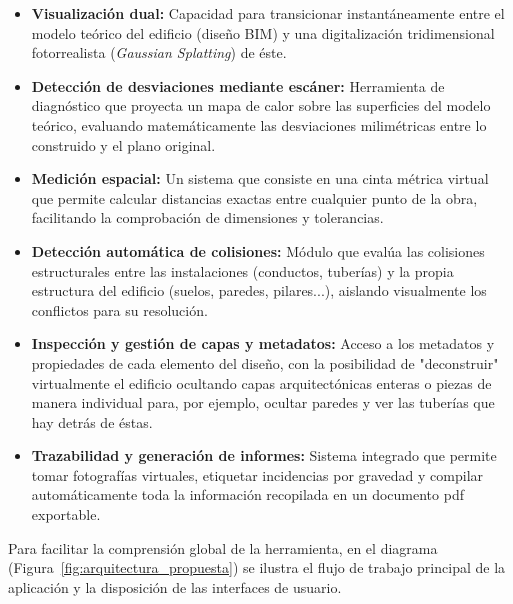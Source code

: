 \begin{itemize}
    \item \textbf{Visualización dual:} Capacidad para transicionar instantáneamente entre el modelo teórico del edificio (diseño BIM) y una digitalización tridimensional fotorrealista (\textit{Gaussian Splatting}) de éste.
    \item \textbf{Detección de desviaciones mediante escáner:} Herramienta de diagnóstico que proyecta un mapa de calor sobre las superficies del modelo teórico, evaluando matemáticamente las desviaciones milimétricas entre lo construido y el plano original.
    \item \textbf{Medición espacial:} Un sistema que consiste en una cinta métrica virtual que permite calcular distancias exactas entre cualquier punto de la obra, facilitando la comprobación de dimensiones y tolerancias.
    \item \textbf{Detección automática de colisiones:} Módulo que evalúa las colisiones estructurales entre las instalaciones (conductos, tuberías) y la propia estructura del edificio (suelos, paredes, pilares...), aislando visualmente los conflictos para su resolución.
    \item \textbf{Inspección y gestión de capas y metadatos:} Acceso a los metadatos y propiedades de cada elemento del diseño, con la posibilidad de "deconstruir" virtualmente el edificio ocultando capas arquitectónicas enteras o piezas de manera individual para, por ejemplo, ocultar paredes y ver las tuberías que hay detrás de éstas.
    \item \textbf{Trazabilidad y generación de informes:} Sistema integrado que permite tomar fotografías virtuales, etiquetar incidencias por gravedad y compilar automáticamente toda la información recopilada en un documento \gls{pdf} exportable.
\end{itemize}

Para facilitar la comprensión global de la herramienta, en el diagrama (Figura~\ref{fig:arquitectura_propuesta}) se ilustra el flujo de trabajo principal de la aplicación y la disposición de las interfaces de usuario.

